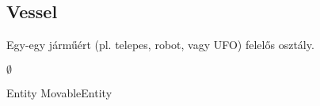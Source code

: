 \documentclass[../../projlab]{subfiles}
\begin{document}
\subsection{Vessel}
\begin{class-template-responsibility}
Egy-egy járműért (pl. telepes, robot, vagy UFO) felelős osztály. 
\end{class-template-responsibility}
\begin{class-template-interface}
$\emptyset$
\end{class-template-interface}
\begin{class-template-baseclass}
Entity \baseclass MovableEntity
\end{class-template-baseclass}
\begin{class-template-attribute}
\end{class-template-attribute}
\end{document}
